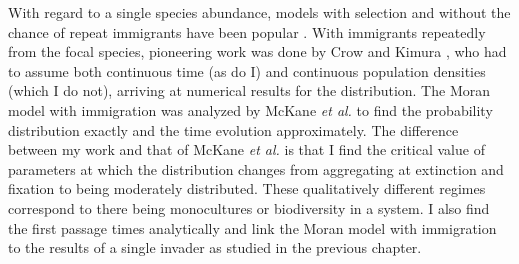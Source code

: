 With regard to a single species abundance, models with selection and without the chance of repeat immigrants have been popular \cite{Taylor2004,Claussen2005,Lambert2006,Blythe2007,Parsons2007,Pigolotti2013,Chalub2016,Czuppon2017}. 
With immigrants repeatedly from the focal species, pioneering work was done by Crow and Kimura \cite{Crow1956,Kimura1983}, who had to assume both continuous time (as do I) and continuous population densities (which I do not), arriving at numerical results for the distribution. 
The Moran model with immigration was analyzed by McKane \emph{et al.} \cite{McKane2003} to find the probability distribution exactly and the time evolution approximately. 
The difference between my work and that of McKane \emph{et al.} is that I find the critical value of parameters at which the distribution changes from aggregating at extinction and fixation to being moderately distributed. %
These qualitatively different regimes correspond to there being monocultures or biodiversity in a system. 
I also find the first passage times analytically and link the Moran model with immigration to the results of a single invader as studied in the previous chapter. 

